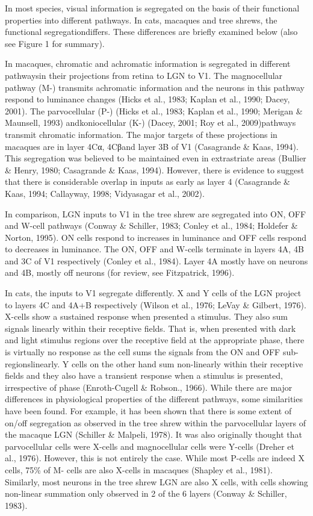 In most species, visual information is segregated on the basis of their functional properties into different pathways. In cats, macaques and tree shrews, the functional segregationdiffers. These differences are briefly examined below (also see Figure 1 for summary).

In macaques, chromatic and achromatic information is segregated in different pathwaysin their projections from retina to LGN to V1. The magnocellular pathway (M-) transmits achromatic information and the neurons in this pathway respond to luminance changes (Hicks et al., 1983; Kaplan et al., 1990; Dacey, 2001). The parvocellular (P-) (Hicks et al., 1983; Kaplan et al., 1990; Merigan \& Maunsell, 1993) andkoniocellular (K-) (Dacey, 2001; Roy et al., 2009)pathways transmit chromatic information. The  major targets of these projections in macaques are in layer 4Cα, 4Cβand layer 3B of V1 (Casagrande \& Kaas, 1994). This segregation was believed to be maintained even in extrastriate areas (Bullier \& Henry, 1980; Casagrande \& Kaas, 1994). However, there is evidence to suggest that there is considerable overlap in inputs as early as layer 4 (Casagrande \& Kaas, 1994; Callayway, 1998; Vidyasagar et al., 2002).

In comparison, LGN inputs to V1 in the tree shrew are segregated into ON, OFF and W-cell pathways (Conway \& Schiller, 1983; Conley et al., 1984; Holdefer \& Norton, 1995). ON cells respond to increases in luminance and OFF cells respond to decreases in luminance. The ON, OFF and W-cells terminate in layers 4A, 4B and 3C of V1 respectively (Conley et al., 1984). Layer 4A mostly have on neurons and 4B, mostly off neurons (for review, see Fitzpatrick, 1996).

In cats, the inputs to V1 segregate differently. X and Y cells of the LGN project to layers 4C and 4A+B respectively (Wilson et al., 1976; LeVay \& Gilbert, 1976). X-cells show a sustained response when presented a stimulus. They also sum signals linearly within their receptive fields. That is, when presented with dark and light stimulus regions over the receptive field at the appropriate phase, there is virtually no response as the cell sums the signals from the ON and OFF sub-regionslinearly. Y cells on the other hand sum non-linearly within their receptive fields and they also have a transient response when a stimulus is presented, irrespective of phase (Enroth-Cugell \& Robson., 1966).
While there are major differences in physiological properties of the different pathways, some similarities have been found. For example, it has been shown that there is some extent of on/off segregation as observed in the tree shrew within the parvocellular layers of the macaque LGN (Schiller \& Malpeli, 1978). It was also originally thought that parvocellular cells were X-cells and magnocellular cells were Y-cells (Dreher et al., 1976). However, this is not entirely the case. While most P-cells are indeed X cells, 75\% of M- cells are also X-cells in macaques (Shapley et al., 1981). Similarly, most neurons in the tree shrew LGN are also X cells, with cells showing non-linear summation only observed in 2 of the 6 layers (Conway \& Schiller, 1983).


